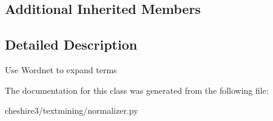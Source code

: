 \subsection*{Additional Inherited Members}


\subsection{Detailed Description}
\begin{DoxyVerb}Use Wordnet to expand terms \end{DoxyVerb}
 

The documentation for this class was generated from the following file\-:\begin{DoxyCompactItemize}
\item 
cheshire3/textmining/normalizer.\-py\end{DoxyCompactItemize}
